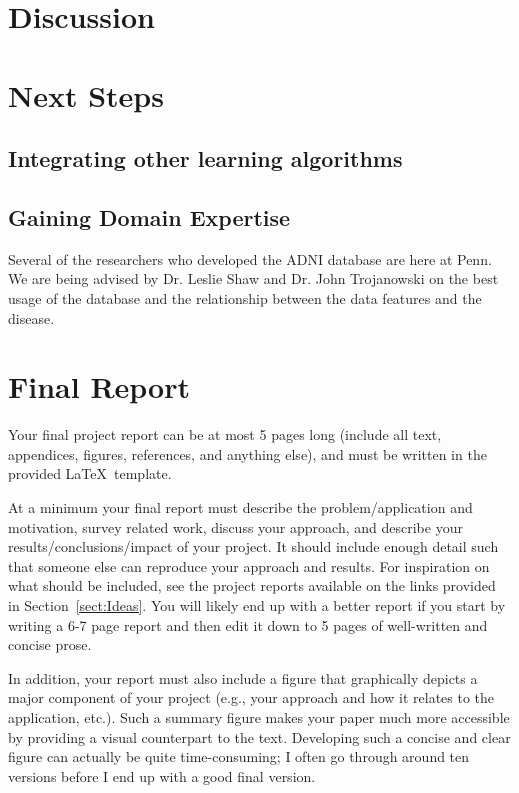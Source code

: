 \documentclass{article}
\begin{document}
\section{Discussion}

\section{Next Steps}
\subsection{Integrating other learning algorithms}

\subsection{Gaining Domain Expertise}
Several of the researchers who developed the ADNI database are here at Penn. We are being advised by Dr. Leslie Shaw and Dr. John Trojanowski on the best usage of the database and the relationship between the data features and the disease.


\section{Final Report}

Your final project report can be at most 5 pages long (include all text, appendices, figures, references, and anything else), and must be written in the provided \LaTeX\ template. 

At a minimum your final report must describe the problem/application and motivation, survey related work, discuss your approach, and describe your results/conclusions/impact of your project.  It should include enough detail such that someone else can reproduce your approach and results.  For inspiration on what should be included, see the project reports available on the links provided in Section~\ref{sect:Ideas}.  You will likely end up with a better report if you start by writing a 6-7 page report and then edit it down to 5 pages of well-written and concise prose.

In addition, your report must also include a figure that graphically depicts a major component of your project (e.g., your approach and how it relates to the application, etc.).  Such a summary figure makes your paper much more accessible by providing a visual counterpart to the text.  Developing such a concise and clear figure can actually be quite time-consuming; I often go through around ten versions before I end up with a good final version.
\end{document}
